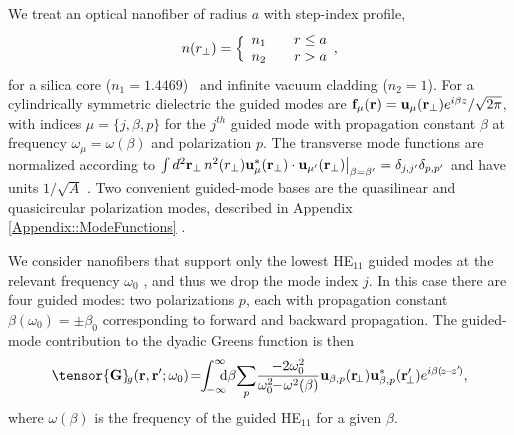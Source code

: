 \documentclass[preprint, aps,pra,onecolumn]{revtex4-1} %
\begin{document}
We treat an optical nanofiber of radius $a$ with step-index profile,
	\begin{align} \label{Eq::IndexofRefraction}
		n(r_\perp) = \Big\{  
			\begin{array}{l l} n_1 & \quad r \leq a \\
						 n_2 & \quad r > a 
		\end{array},
	\end{align}
for a silica core ($n_1 = 1.4469$)~\cite{kien_field_2004} and infinite vacuum cladding ($n_2 = 1$).  For a cylindrically symmetric dielectric the guided modes are $\mathbf{f}_\mu (\mathbf{r}) = \mathbf{u}_\mu (\mathbf{r}_\perp) e^{i\beta z}/\sqrt{2 \pi}$, with indices $\mu=\{j, \beta , p\}$ for the $j^{th}$ guided mode with propagation constant $\beta$ at frequency $\omega_\mu=\omega(\beta)$ and polarization $p$.  The transverse mode functions are normalized according to $\int d^2 \mathbf{r}_\perp \, n^2(r_\perp)\mathbf{u}^*_\mu (\mathbf{r}_\perp) \cdot \mathbf{u}_{\mu'} (\mathbf{r}_\perp)\big|_{\beta = \beta'} = \delta_{j,j'}\delta_{p,p'}$ and have units $1/\sqrt{A}$ \cite{le_kien_anisotropy_2014}.  Two convenient guided-mode bases are the quasilinear and quasicircular polarization modes, described in Appendix \ref{Appendix::ModeFunctions} \cite{kien_field_2004}.  

We consider nanofibers that support only the lowest HE$_{11}$ guided modes at the relevant frequency $\omega_0$ \cite{snyder_optical_1983}, and thus we drop the mode index $j$.  In this case there are four guided modes: two polarizations $p$, each with propagation constant $\beta(\omega_0) = \pm\beta_0$ corresponding to forward and backward propagation.  The guided-mode contribution to the dyadic Greens function is then 
	\begin{equation} \label{Eq::GreensEigenmodes}
		\tensor{\mathbf{G}}\!_g(\br,\br'; \omega_0) \!=\!\! \int_{\!-\infty}^\infty\!\!\!\! \mathrm{d} \beta \!\sum_{p}\! 
\frac{-2\omega_0^2}{\omega_0^2\!\!-\!\omega^2(\beta)} \mathbf{u}_{\beta,p} (\br\!_\perp)\mathbf{u}^*_{\beta,p} 
(\br_{\!\perp}^\prime) e^{i\beta(\!z\!-\!z'\!)},
	\end{equation}
where $ \omega(\beta)$ is the frequency of the guided HE$_{11}$ for a given $\beta$.  
\end{document}
